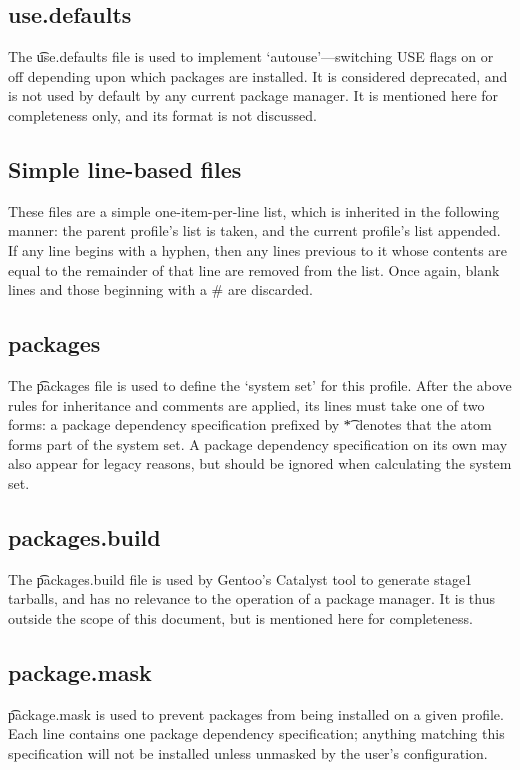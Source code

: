 \subsection{use.defaults}
The \t{use.defaults} file is used to implement `autouse'---switching USE flags on or off depending
upon which packages are installed. It is considered deprecated, and is not used by default by any
current package manager. It is mentioned here for completeness only, and its format is not
discussed.

\subsection{Simple line-based files}
\label{line-stacking}
These files are a simple one-item-per-line list, which is inherited in the following manner: the
parent profile's list is taken, and the current profile's list appended. If any line begins with a
hyphen, then any lines previous to it whose contents are equal to the remainder of that line are
removed from the list. Once again, blank lines and those beginning with a \# are discarded.

\subsection{packages}
The \t{packages} file is used to define the `system set' for this profile.
After the above rules for inheritance and comments are applied, its lines must take one of two
forms: a package dependency specification prefixed by \t{*} denotes that the atom forms part of the
system set. A package dependency specification on its own may also appear for legacy reasons, but
should be ignored when calculating the system set.

\subsection{packages.build}
The \t{packages.build} file is used by Gentoo's Catalyst tool to generate stage1 tarballs, and has
no relevance to the operation of a package manager. It is thus outside the scope of this document,
but is mentioned here for completeness.

\subsection{package.mask}
\t{package.mask} is used to prevent packages from being installed on a given profile. Each line
contains one package dependency specification; anything matching this specification will not be
installed unless unmasked by the user's configuration.

